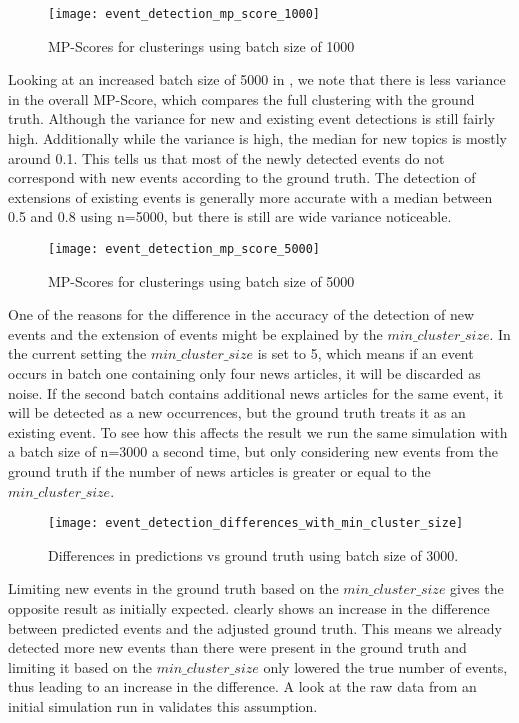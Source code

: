 \begin{figure}[h]
    \centering
    \texttt{[image: event\_detection\_mp\_score\_1000]}
    \caption{MP-Scores for clusterings using batch size of 1000}
    \label{fig:event_detection_mp_score_1000}
\end{figure}

Looking at an increased batch size of 5000 in ,
we note that there is less variance in the overall MP-Score, which compares the full clustering with the ground truth.
Although the variance for new and existing event detections is still fairly high.
Additionally while the variance is high, the median for new topics is mostly around 0.1.
This tells us that most of the newly detected events do not correspond with new events according to the ground truth.
The detection of extensions of existing events is generally more accurate
with a median between 0.5 and 0.8 using n=5000, but there is still are wide variance noticeable.

\begin{figure}[h]
    \centering
    \texttt{[image: event\_detection\_mp\_score\_5000]}
    \caption{MP-Scores for clusterings using batch size of 5000}
    \label{fig:event_detection_mp_score_5000}
\end{figure}

One of the reasons for the difference in the accuracy of the detection of new events and the extension of events
might be explained by the $min\_cluster\_size$.
In the current setting the $min\_cluster\_size$ is set to 5,
which means if an event occurs in batch one containing only four news articles,
it will be discarded as noise.
If the second batch contains additional news articles for the same event,
it will be detected as a new occurrences, but the ground truth treats it as an existing event.
To see how this affects the result we run the same simulation with a batch size of n=3000 a second time,
but only considering new events from the ground truth
if the number of news articles is greater or equal to the $min\_cluster\_size$.

\begin{figure}[h]
    \centering
    \texttt{[image: event\_detection\_differences\_with\_min\_cluster\_size]}
    \caption{Differences in predictions vs ground truth using batch size of 3000.}
    \label{fig:event_detection_differences_with_min_cluster_size}
\end{figure}

Limiting new events in the ground truth based on the $min\_cluster\_size$
gives the opposite result as initially expected.
 clearly shows
an increase in the difference between predicted events and the adjusted ground truth.
This means we already detected more new events than there were present in the ground truth
and limiting it based on the $min\_cluster\_size$ only lowered the true number of events,
thus leading to an increase in the difference.
A look at the raw data from an initial simulation run in 
validates this assumption.


